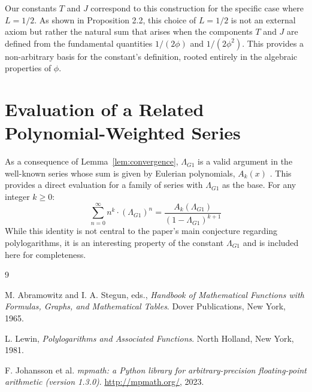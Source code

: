 \documentclass{amsart}
\theoremstyle{plain}
\theoremstyle{definition}
\theoremstyle{remark}
\newcommand{\LambdaG}{\Lambda_{G1}}
\begin{document}
Our constants $T$ and $J$ correspond to this construction for the specific case where $L=1/2$. As shown in Proposition 2.2, this choice of $L=1/2$ is not an external axiom but rather the natural sum that arises when the components $T$ and $J$ are defined from the fundamental quantities $1/(2\phi)$ and $1/(2\phi^2)$. This provides a non-arbitrary basis for the constant's definition, rooted entirely in the algebraic properties of $\phi$.

\section{Evaluation of a Related Polynomial-Weighted Series}
As a consequence of Lemma~\ref{lem:convergence}, $\LambdaG$ is a valid argument in the well-known series whose sum is given by Eulerian polynomials, $A_k(x)$ \cite{AandS}. This provides a direct evaluation for a family of series with $\LambdaG$ as the base. For any integer $k \ge 0$:
$$ \sum_{n=0}^{\infty} n^k \cdot (\LambdaG)^n = \frac{A_k(\LambdaG)}{(1-\LambdaG)^{k+1}} $$
While this identity is not central to the paper's main conjecture regarding polylogarithms, it is an interesting property of the constant $\LambdaG$ and is included here for completeness.

\begin{thebibliography}{9}

M. Abramowitz and I. A. Stegun, eds.,
\textit{Handbook of Mathematical Functions with Formulas, Graphs, and Mathematical Tables}.
Dover Publications, New York, 1965.

L. Lewin,
\textit{Polylogarithms and Associated Functions}.
North Holland, New York, 1981.

F. Johansson et al.
\textit{mpmath: a Python library for arbitrary-precision floating-point arithmetic (version 1.3.0)}.
\url{http://mpmath.org/}, 2023.

\end{thebibliography}
\end{document}
